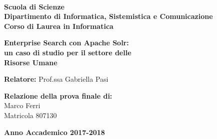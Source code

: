 
\begin{titlepage}
	
	\noindent
	\begin{minipage}[t]{0.18\textwidth}
	\end{minipage}
	\begin{minipage}[t]{0.82\textwidth}
		{
			 \\
			\textbf{Scuola di Scienze} \\
			\textbf{Dipartimento di Informatica, Sistemistica e Comunicazione} \\
			\textbf{Corso di Laurea in Informatica} \\
			\par
		}
	\end{minipage}
	
	\vspace{40mm}
	
	\begin{center}
		{\LARGE{
				\textbf{Enterprise Search con Apache Solr:  \\ un caso di studio per il settore delle \\ Risorse Umane}
				\par
		}}
	\end{center}
	
	\vspace{40mm}
	
	\noindent
	{\large \textbf{Relatore:} Prof.ssa Gabriella Pasi } \\
	
	
	\vspace{15mm}
	
	\begin{flushright}
		{\large \textbf{Relazione della prova finale di:}} \\
		\large{Marco Ferri} \\
		\large{Matricola 807130} 
	\end{flushright}
	
	\vspace{30mm}
	\begin{center}
		{\large{\bf Anno Accademico 2017-2018}}
	\end{center}
	
	\restoregeometry
	
\end{titlepage}